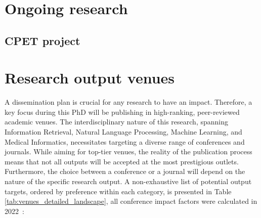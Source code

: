 \documentclass[10pt,oneside]{book}
\begin{document}
\section{Ongoing research}

\subsection{CPET project}

\section{Research output venues}

A dissemination plan is crucial for any research to have an impact. Therefore, a key focus during this PhD will be publishing in high-ranking, peer-reviewed academic venues. The interdisciplinary nature of this research, spanning Information Retrieval, Natural Language Processing, Machine Learning, and Medical Informatics, necessitates targeting a diverse range of conferences and journals. While aiming for top-tier venues, the reality of the publication process means that not all outputs will be accepted at the most prestigious outlets. Furthermore, the choice between a conference or a journal will depend on the nature of the specific research output. A non-exhaustive list of potential output targets, ordered by preference within each category, is presented in Table \ref{tab:venues_detailed_landscape}, all conference impact factors were calculated in 2022~\cite{eickhoff_impact_2023}:
\end{document}

